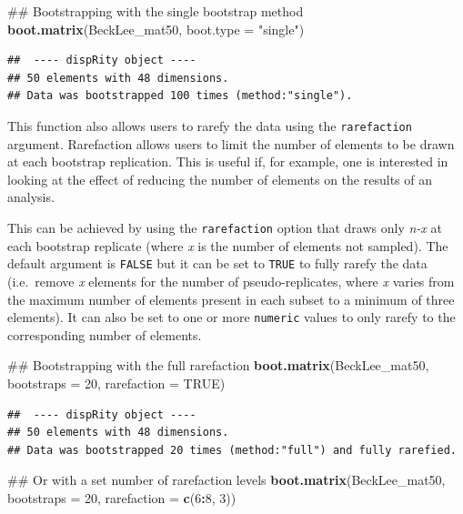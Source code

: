 \documentclass[]{book}
\newenvironment{Shaded}{\begin{snugshade}}{\end{snugshade}}
\newcommand{\KeywordTok}[1]{\textcolor[rgb]{0.13,0.29,0.53}{\textbf{#1}}}
\newcommand{\DataTypeTok}[1]{\textcolor[rgb]{0.13,0.29,0.53}{#1}}
\newcommand{\DecValTok}[1]{\textcolor[rgb]{0.00,0.00,0.81}{#1}}
\newcommand{\StringTok}[1]{\textcolor[rgb]{0.31,0.60,0.02}{#1}}
\newcommand{\OtherTok}[1]{\textcolor[rgb]{0.56,0.35,0.01}{#1}}
\newcommand{\OperatorTok}[1]{\textcolor[rgb]{0.81,0.36,0.00}{\textbf{#1}}}
\newcommand{\NormalTok}[1]{#1}
\theoremstyle{definition}
\theoremstyle{definition}
\theoremstyle{definition}
\theoremstyle{remark}
\begin{document}
\begin{Shaded}
\begin{Highlighting}[]
\NormalTok{## Bootstrapping with the single bootstrap method}
\KeywordTok{boot.matrix}\NormalTok{(BeckLee_mat50, }\DataTypeTok{boot.type =} \StringTok{"single"}\NormalTok{)}
\end{Highlighting}
\end{Shaded}

\begin{verbatim}
##  ---- dispRity object ---- 
## 50 elements with 48 dimensions.
## Data was bootstrapped 100 times (method:"single").
\end{verbatim}

This function also allows users to rarefy the data using the
\texttt{rarefaction} argument. Rarefaction allows users to limit the
number of elements to be drawn at each bootstrap replication. This is
useful if, for example, one is interested in looking at the effect of
reducing the number of elements on the results of an analysis.

This can be achieved by using the \texttt{rarefaction} option that draws
only \emph{n-x} at each bootstrap replicate (where \emph{x} is the
number of elements not sampled). The default argument is \texttt{FALSE}
but it can be set to \texttt{TRUE} to fully rarefy the data (i.e.~remove
\emph{x} elements for the number of pseudo-replicates, where \emph{x}
varies from the maximum number of elements present in each subset to a
minimum of three elements). It can also be set to one or more
\texttt{numeric} values to only rarefy to the corresponding number of
elements.

\begin{Shaded}
\begin{Highlighting}[]
\NormalTok{## Bootstrapping with the full rarefaction}
\KeywordTok{boot.matrix}\NormalTok{(BeckLee_mat50, }\DataTypeTok{bootstraps =} \DecValTok{20}\NormalTok{, }\DataTypeTok{rarefaction =} \OtherTok{TRUE}\NormalTok{)}
\end{Highlighting}
\end{Shaded}

\begin{verbatim}
##  ---- dispRity object ---- 
## 50 elements with 48 dimensions.
## Data was bootstrapped 20 times (method:"full") and fully rarefied.
\end{verbatim}

\begin{Shaded}
\begin{Highlighting}[]
\NormalTok{## Or with a set number of rarefaction levels}
\KeywordTok{boot.matrix}\NormalTok{(BeckLee_mat50, }\DataTypeTok{bootstraps =} \DecValTok{20}\NormalTok{, }\DataTypeTok{rarefaction =} \KeywordTok{c}\NormalTok{(}\DecValTok{6}\OperatorTok{:}\DecValTok{8}\NormalTok{, }\DecValTok{3}\NormalTok{))}
\end{Highlighting}
\end{Shaded}
\end{document}
